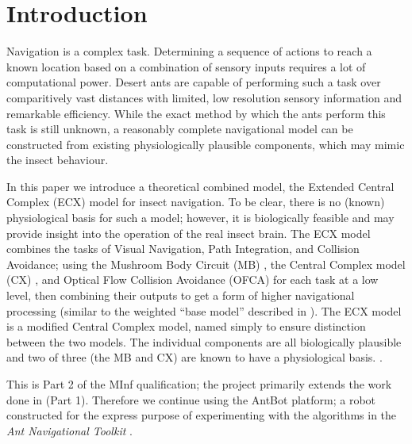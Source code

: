 \documentclass[a4paper,11pt,twoside,openright]{article}
\let\oldsection\section
\def\section{\cleardoublepage\oldsection}
\begin{document}

\raggedright

\section{ Introduction }
Navigation is a complex task. Determining a sequence of actions to reach a
known location based on a combination of sensory inputs requires a lot of
computational power. Desert ants are capable of performing such a task
over comparitively vast distances with limited, low resolution sensory
information and remarkable efficiency. While the exact method by which
the ants perform this task is still unknown, a reasonably complete navigational
model can be constructed from existing physiologically plausible components,
which may mimic the insect behaviour.
\newline
\par

In this paper we introduce a theoretical combined model, the Extended
Central Complex (ECX) model for insect navigation. To be clear, there
is no (known) physiological basis for such a model; however, it is
biologically feasible and may provide insight into the operation of
the real insect brain. The ECX model combines the tasks of Visual
Navigation, Path Integration, and Collision Avoidance; using the
Mushroom Body Circuit (MB) \cite{Ardin2016}, the Central Complex model
(CX) \cite{Stone2017}, and Optical Flow Collision Avoidance (OFCA)
\cite{Mitchell2018, Stewart2010} for each task at a low level, then
combining their outputs to get a form of higher navigational
processing (similar to the weighted ``base model'' described in
\cite{Webb2019}).  The ECX model is a modified Central Complex model,
named simply to ensure distinction between the two models. The
individual components are all biologically plausible and two of three
(the MB and CX) are known to have a physiological
basis. \cite{Ardin2016, Stone2017, Mitchell2018, Stewart2010,
  Julien2017}.
\newline
\par

This is Part 2 of the MInf qualification; the project primarily
extends the work done in \cite{Mitchell2018} (Part 1). Therefore we
continue using the AntBot platform; a robot constructed for the
express purpose of experimenting with the algorithms in the
\textit{Ant Navigational Toolkit} \cite{Eberding2016, Wehner2009}.
\end{document}
